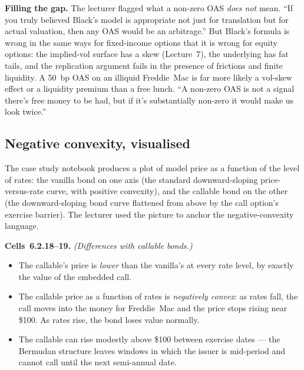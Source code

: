 \begin{tipblock}
\textbf{Filling the gap.} The lecturer flagged what a non-zero OAS
\emph{does not} mean. ``If you truly believed Black's model is
appropriate not just for translation but for actual valuation, then any
OAS would be an arbitrage.'' But Black's formula is wrong in the same
ways for fixed-income options that it is wrong for equity options: the
implied-vol surface has a skew (Lecture~7), the underlying has fat
tails, and the replication argument fails in the presence of frictions
and finite liquidity. A 50~bp OAS on an illiquid Freddie~Mac is far
more likely a vol-skew effect or a liquidity premium than a free
lunch. ``A non-zero OAS is not a signal there's free money to be had,
but if it's substantially non-zero it would make us look twice.''
\end{tipblock}

\subsection{Negative convexity, visualised}\label{L5-sec:neg-convex}

The case study notebook produces a plot of model price as a function
of the level of rates: the vanilla bond on one axis (the standard
downward-sloping price-versus-rate curve, with positive convexity),
and the callable bond on the other (the downward-sloping bond curve
flattened from above by the call option's exercise barrier). The
lecturer used the picture to anchor the negative-convexity language.

\begin{keyblock}
\textbf{Cells~6.2.18--19.} \emph{(Differences with callable bonds.)}
\begin{itemize}
  \item The callable's price is \emph{lower} than the vanilla's at
        every rate level, by exactly the value of the embedded call.
  \item The callable price as a function of rates is \emph{negatively
        convex}: as rates fall, the call moves into the money for
        Freddie~Mac and the price stops rising near \$100. As rates
        rise, the bond loses value normally.
  \item The callable can rise modestly above \$100 between exercise
        dates --- the Bermudan structure leaves windows in which the
        issuer is mid-period and cannot call until the next semi-annual
        date.
\end{itemize}
\end{keyblock}

